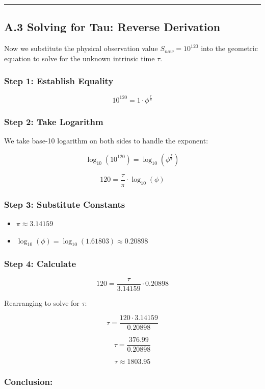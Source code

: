 \hrule

\subsection{A.3 Solving for Tau: Reverse Derivation}

Now we substitute the physical observation value $S_{now} = 10^{120}$ into the geometric equation to solve for the unknown intrinsic time $\tau$.

\subsubsection{Step 1: Establish Equality}

$$10^{120} = 1 \cdot \phi^{\frac{\tau}{\pi}}$$

\subsubsection{Step 2: Take Logarithm}

We take base-10 logarithm on both sides to handle the exponent:

$$\log_{10}(10^{120}) = \log_{10}\left(\phi^{\frac{\tau}{\pi}}\right)$$

$$120 = \frac{\tau}{\pi} \cdot \log_{10}(\phi)$$

\subsubsection{Step 3: Substitute Constants}

\begin{itemize}
\item $\pi \approx 3.14159$

\item $\log_{10}(\phi) = \log_{10}(1.61803) \approx 0.20898$
\end{itemize}

\subsubsection{Step 4: Calculate}

$$120 = \frac{\tau}{3.14159} \cdot 0.20898$$

Rearranging to solve for $\tau$:

$$\tau = \frac{120 \cdot 3.14159}{0.20898}$$

$$\tau = \frac{376.99}{0.20898}$$

$$\tau \approx 1803.95$$

\subsubsection{Conclusion:}

